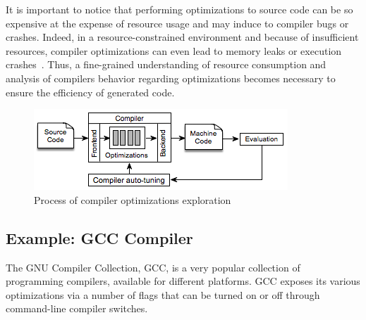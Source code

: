 It is important to notice that performing optimizations to source code can be so expensive at the expense of resource usage and may induce to compiler bugs or crashes. 
Indeed, in a resource-constrained environment and because of insufficient resources, compiler optimizations can even lead to memory leaks or execution crashes~\cite{yang2011finding}. 
Thus, a fine-grained understanding of resource consumption and analysis of compilers behavior regarding optimizations becomes necessary to ensure the efficiency of generated code.
\begin{figure}[h]
	\centering
	\includegraphics[width=0.9\linewidth]{Ressources/autotuning.png}
	\caption{Process of compiler optimizations exploration}
\end{figure}
\subsection{Example: GCC Compiler}

The GNU Compiler Collection, GCC, is a very popular collection of programming compilers, available for different platforms.
GCC exposes its various optimizations via a number of flags that can be turned on or off through command-line compiler switches. 


